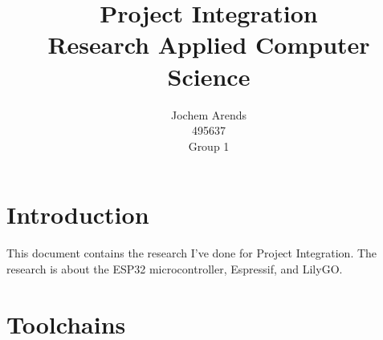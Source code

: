 \documentclass{article}
\title{Project Integration \\ Research Applied Computer Science}
\author{Jochem Arends \\ 495637 \\ Group 1}
\begin{document}
\maketitle
\newpage

\tableofcontents
\newpage

\section{Introduction}
This document contains the research I've done for Project Integration.
The research is about the ESP32 microcontroller, Espressif, and LilyGO.

\section{Toolchains}

\cite{test}


\newpage

\end{document}
